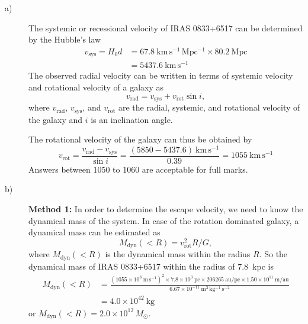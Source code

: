 \begin{description}
\item[a)] The systemic or recessional velocity of IRAS 0833+6517 can be
  determined by the Hubble's law
  \begin{align*}
  v_{\mathrm{sys}} = H_0 d
  &= 67.8~\mathrm{km\,s^{-1}\,Mpc^{-1}} \times 80.2~\mathrm{Mpc} \\
  &= 5437.6~\mathrm{km\,s^{-1}}
  \tag*{[2]}
  \end{align*}
  The observed radial velocity can be written in terms of systemic velocity
  and rotational velocity of a galaxy as
  \begin{equation*}
  v_{\mathrm{rad}} = v_{\mathrm{sys}} + v_{\mathrm{rot}} \sin i,
  \tag*{[1]}
  \end{equation*}
  where $v_{\mathrm{rad}}$, $v_{\mathrm{sys}}$, and $v_{\mathrm{rot}}$ are the
  radial, systemic, and rotational velocity of the galaxy and $i$ is an
  inclination angle.

  The rotational velocity of the galaxy can thus be obtained by
  \begin{equation*}
  v_{\mathrm{rot}} = \frac{v_{\mathrm{rad}} - v_{\mathrm{sys}}}{\sin i}
  = \frac{(5850 - 5437.6)~\mathrm{km\,s^{-1}}}{0.39}
  = 1055~\mathrm{km\,s^{-1}}
  \tag*{[2]}
  \end{equation*}
  Answers between 1050 to 1060 are acceptable for full marks.

\item[b)] \textbf{Method 1:} In order to determine the escape velocity, we
  need to know the dynamical mass of the system. In case of the rotation
  dominated galaxy, a dynamical mass can be estimated as
  \begin{equation*}
  M_{\mathrm{dyn}}(<R) = v_{\mathrm{rot}}^2 R / G,
  \tag*{[2]}
  \end{equation*}
  where $M_{\mathrm{dyn}}(<R)$ is the dynamical mass within the radius $R$.
  So the dynamical mass of IRAS 0833+6517 within the radius of 7.8~kpc is
  \begin{align*}
  M_{\mathrm{dyn}}(<R)
  &= \frac{(1055 \times 10^{3}~\mathrm{m\,s^{-1}})^{2}
     \times 7.8 \times 10^{3}~\mathrm{pc} \times 206265~\mathrm{au/pc}
     \times 1.50 \times 10^{11}~\mathrm{m/au}}
     {6.67 \times 10^{-11}~\mathrm{m^{3}\,kg^{-1}\,s^{-2}}} \\
  &= 4.0 \times 10^{42}~\mathrm{kg}
  \tag*{[2]}
  \end{align*}
  or $M_{\mathrm{dyn}}(<R) = 2.0 \times 10^{12}\,M_\odot$.


\end{description}
